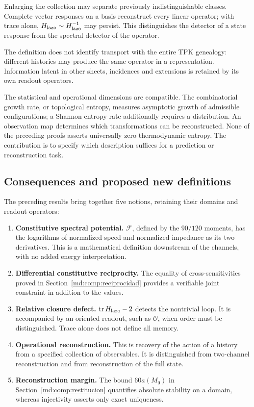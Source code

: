 Enlarging the collection may separate previously indistinguishable
classes. Complete vector responses on a basis reconstruct every linear
operator; with trace alone,
\(H_{\rm lazo}\sim H_{\rm lazo}^{-1}\) may persist.
This distinguishes the detector of a state response from the spectral
detector of the operator.

The definition does not identify transport with the entire TPK
genealogy: different histories may produce the same operator in a
representation. Information latent in other sheets, incidences and
extensions is retained by its own readout operators.

The statistical and operational dimensions are compatible.
The combinatorial growth rate, or topological entropy, measures
asymptotic growth of admissible configurations; a Shannon entropy
rate additionally requires a distribution.
An observation map determines which transformations can be reconstructed.
None of the preceding proofs asserts universally zero thermodynamic
entropy. The contribution is to specify which description suffices
for a prediction or reconstruction task.

\subsection{Consequences and proposed new definitions}
\label{md:comp:consecuencias}

The preceding results bring together five notions, retaining their
domains and readout operators:
\begin{enumerate}
 \item \textbf{Constitutive spectral potential.}
 \(\mathscr F\), defined by the \(90/120\) moments, has the logarithms
 of normalized speed and normalized impedance as its two derivatives.
 This is a mathematical definition downstream of the channels, with
 no added energy interpretation.

 \item \textbf{Differential constitutive reciprocity.}
 The equality of cross-sensitivities proved in
 Section~\ref{md:comp:reciprocidad} provides a verifiable joint
 constraint in addition to the values.

 \item \textbf{Relative closure defect.}
 \(\operatorname{tr}H_{\rm lazo}-2\) detects the nontrivial loop.
 It is accompanied by an oriented readout, such as \(\mathcal O\),
 when order must be distinguished. Trace alone does not define all memory.

 \item \textbf{Operational reconstruction.}
 This is recovery of the action of a history from a specified
 collection of observables. It is distinguished from two-channel
 reconstruction and from reconstruction of the full state.

 \item \textbf{Reconstruction margin.}
 The bound \(60a(M_0)\) in Section~\ref{md:comp:restitucion}
 quantifies absolute stability on a domain, whereas injectivity
 asserts only exact uniqueness.
\end{enumerate}

